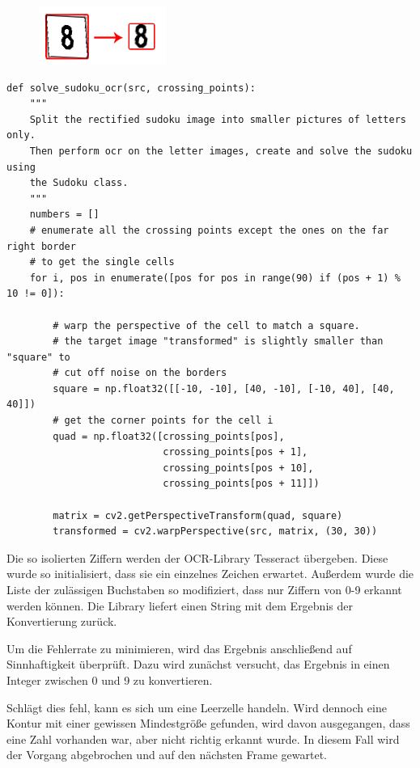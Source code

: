 \begin{figure}[H]
    \begin{center}
        \includegraphics[]{Abbildungen/Ziffer}
    \end{center}
\end{figure}

\begin{lstlisting}
def solve_sudoku_ocr(src, crossing_points):
    """
    Split the rectified sudoku image into smaller pictures of letters only.
    Then perform ocr on the letter images, create and solve the sudoku using
    the Sudoku class.
    """
    numbers = []
    # enumerate all the crossing points except the ones on the far right border
    # to get the single cells
    for i, pos in enumerate([pos for pos in range(90) if (pos + 1) % 10 != 0]):

        # warp the perspective of the cell to match a square.
        # the target image "transformed" is slightly smaller than "square" to
        # cut off noise on the borders
        square = np.float32([[-10, -10], [40, -10], [-10, 40], [40, 40]])
        # get the corner points for the cell i
        quad = np.float32([crossing_points[pos],
                           crossing_points[pos + 1],
                           crossing_points[pos + 10],
                           crossing_points[pos + 11]])

        matrix = cv2.getPerspectiveTransform(quad, square)
        transformed = cv2.warpPerspective(src, matrix, (30, 30))
\end{lstlisting}

Die so isolierten Ziffern werden der OCR-Library Tesseract übergeben.
Diese wurde so initialisiert, dass sie ein einzelnes Zeichen erwartet. Außerdem wurde die Liste der zulässigen Buchstaben so modifiziert, dass nur Ziffern von 0-9 erkannt werden können.
Die Library liefert einen String mit dem Ergebnis der Konvertierung zurück.

Um die Fehlerrate zu minimieren, wird das Ergebnis anschließend auf Sinnhaftigkeit überprüft.
Dazu wird zunächst versucht, das Ergebnis in einen Integer zwischen 0 und 9 zu konvertieren.

Schlägt dies fehl, kann es sich um eine Leerzelle handeln.
Wird dennoch eine Kontur mit einer gewissen Mindestgröße gefunden, wird davon ausgegangen, dass eine Zahl vorhanden war, aber nicht richtig erkannt wurde.
In diesem Fall wird der Vorgang abgebrochen und auf den nächsten Frame gewartet.


